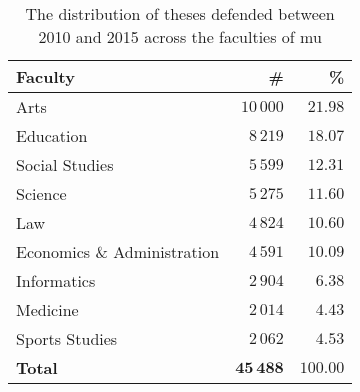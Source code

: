 \documentclass[12pt,twoside,cover,color,table]%
  {fithesis3/fithesis3/fithesis3} %
\begin{document}
  \begin{table}
    \caption{The distribution of theses defended between 2010 and
      2015 across the faculties of \acrshort{mu}}
    \begin{tabularx}{\textwidth}{Xrr}
      \textbf{Faculty} & \textbf{\#} & \textbf{\%} \\
      \toprule
      Arts                         & $10\,000$ & $21.98$ \\%
      Education                    & $8\,219$  & $18.07$ \\%
      Social Studies               & $5\,599$  & $12.31$ \\%
      Science                      & $5\,275$  & $11.60$ \\%
      Law                          & $4\,824$  & $10.60$ \\%
      Economics \& Administration  & $4\,591$  & $10.09$ \\%
      Informatics                  & $2\,904$  &  $6.38$ \\%
      Medicine                     & $2\,014$  &  $4.43$ \\%
      Sports Studies               & $2\,062$  &  $4.53$ \\%
      \bottomrule
      \textbf{Total}     & $\mathbf{45\,488}$ & $\mathbf{100.00}$
    \end{tabularx}
    \label{table:statistics-faculty}
  \end{table}

\end{document}
